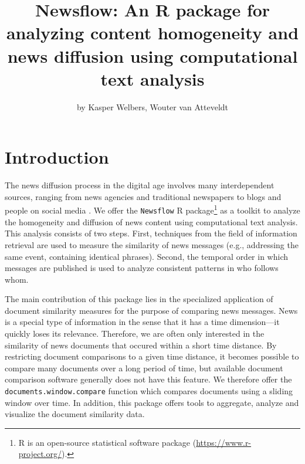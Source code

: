 \title{Newsflow: An R package for analyzing content homogeneity and news
diffusion using computational text analysis}
\author{by Kasper Welbers, Wouter van Atteveldt}

\maketitle


\section{Introduction}

The news diffusion process in the digital age involves many
interdependent sources, ranging from news agencies and traditional
newspapers to blogs and people on social media
\citep{meraz11, paterson05, pew10}. We offer the \texttt{Newsflow} R
package\footnote{R is an open-source statistical software package
  (\url{https://www.r-project.org/}).} as a toolkit to analyze the
homogeneity and diffusion of news content using computational text
analysis. This analysis consists of two steps. First, techniques from
the field of information retrieval are used to measure the similarity of
news messages (e.g., addressing the same event, containing identical
phrases). Second, the temporal order in which messages are published is
used to analyze consistent patterns in who follows whom.

The main contribution of this package lies in the specialized
application of document similarity measures for the purpose of comparing
news messages. News is a special type of information in the sense that
it has a time dimension---it quickly loses its relevance. Therefore, we
are often only interested in the similarity of news documents that
occured within a short time distance. By restricting document
comparisons to a given time distance, it becomes possible to compare
many documents over a long period of time, but available document
comparison software generally does not have this feature. We therefore
offer the \texttt{documents.window.compare} function which compares
documents using a sliding window over time. In addition, this package
offers tools to aggregate, analyze and visualize the document similarity
data.

